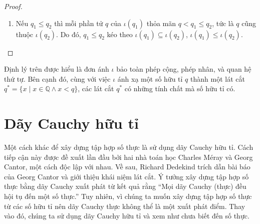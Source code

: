\begin{proof}
\begin{enumerate}[label={(\roman*)}]
\begin{enumerate}[label={\textbf{Trường hợp \arabic*.}},itemindent=2cm]
                        Như vậy $\iota(q_{1}q_{2}) = \iota(q_{1})\iota(q_{2})$ với mọi số hữu tỉ âm $q_{1}$ và số hữu tỉ dương $q_{2}$.
                  \item  $q_{1} < 0$ và $q_{2} < 0$.
                        \begin{align*}
                            \iota(q_{1}q_{2}) & = \iota((-q_{1})(-q_{2}))                                                                          \\
                                              & = \iota(-q_{1})\iota(-q_{2})      & \text{(theo \textbf{Trường hợp 2})}                            \\
                                              & = (-\iota(q_{1}))(-\iota(-q_{2}))                                                                  \\
                                              & = \iota(q_{1})\iota(q_{2})        & \text{(theo Mệnh đề~\ref{proposition:dedekind-cuts-and-sign})}
                        \end{align*}

                        Như vậy $\iota(q_{1}q_{2}) = \iota(q_{1})\iota(q_{2})$ với mọi số hữu tỉ âm $q_{1}, q_{2}$.
              \end{enumerate}

              Vậy $\iota(q_{1}q_{2}) = \iota(q_{1})\iota(q_{2})$ với mọi số hữu tỉ $q_{1}, q_{2}$.
        \item Nếu $q_{1}\leq q_{2}$ thì mỗi phần tử $q$ của $\iota(q_{1})$ thỏa mãn $q < q_{1}\leq q_{2}$, tức là $q$ cũng thuộc $\iota(q_{2})$. Do đó, $q_{1}\leq q_{2}$ kéo theo $\iota(q_{1})\subseteq \iota(q_{2})$, $\iota(q_{1})\leq \iota(q_{2})$.
    \end{enumerate}
\end{proof}

Định lý trên được hiểu là đơn ánh $\iota$ bảo toàn phép cộng, phép nhân, và quan hệ thứ tự. Bên cạnh đó, cùng với việc $\iota$ ánh xạ một số hữu tỉ $q$ thành một lát cắt $q^{*} = \{ x \mid x\in\mathbb{Q}\wedge x < q \}$, các lát cắt $q^{*}$ có những tính chất mà số hữu tỉ có.

\section{Dãy Cauchy hữu tỉ}

Một cách khác để xây dựng tập hợp số thực là sử dụng dãy Cauchy hữu tỉ. Cách tiếp cận này được đề xuất lần đầu bởi hai nhà toán học Charles M\'{e}ray và Georg Cantor, một cách độc lập với nhau. Về sau, Richard Dedekind trích dẫn bài báo của Georg Cantor và giới thiệu khái niệm lát cắt. Ý tưởng xây dựng tập hợp số thực bằng dãy Cauchy xuất phát từ kết quả rằng ``Mọi dãy Cauchy (thực) đều hội tụ đến một số thực.'' Tuy nhiên, vì chúng ta muốn xây dựng tập hợp số thực từ các số hữu tỉ nên dãy Cauchy thực không thể là một xuất phát điểm. Thay vào đó, chúng ta sử dụng dãy Cauchy hữu tỉ và xem như chưa biết đến số thực.

